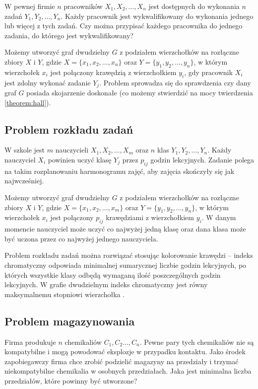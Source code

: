 W pewnej firmie $n$ pracowników $X_1,X_2,\ldots,X_n$ jest dostępnych do wykonania $n$ zadań $Y_1,Y_2,\ldots,Y_n$. Każdy pracownik jest wykwalifikowany do wykonania jednego lub więcej z tych zadań. Czy można przypisać każdego pracownika do jednego zadania, do którego jest wykwalifikowany? 

Możemy utworzyć graf dwudzielny $G$ z podziałem wierzchołków na rozłączne zbiory $X$ i $Y$, gdzie $X=\{x_1,x_2,\ldots,x_n\}$ oraz $Y=\{y_1,y_2,\ldots,y_n\}$, w którym wierzchołek $x_i$ jest połączony krawędzią z wierzchołkiem $y_i$, gdy pracownik $X_i$ jest zdolny wykonać zadanie $Y_j$. Problem sprowadza się do sprawdzenia czy dany graf $G$ posiada skojarzenie doskonałe (co możemy stwierdzić na mocy twierdzenia \ref{theorem:hall}).


\subsection*{Problem rozkładu zadań}

W szkole jest $m$ nauczycieli $X_1,X_2,\ldots,X_m$ oraz $n$ klas $Y_1,Y_2,\ldots,Y_n$. Każdy nauczyciel $X_i$ powinien uczyć klasę $Y_j$ przez $p_{ij}$ godzin lekcyjnych. Zadanie polega na takim rozplanowaniu harmonogramu zajęć, aby zajęcia skończyły się jak najwcześniej. 

Możemy utworzyć graf dwudzielny $G$ z podziałem wierzchołków na rozłączne zbiory $X$ i $Y$, gdzie $X=\{x_1,x_2,\ldots,x_m\}$ oraz $Y=\{y_1,y_2,\ldots,y_n\}$, w którym wierzchołek $x_i$ jest połączony $p_{ij}$ krawędziami z wierzchołkiem $y_i$. W danym momencie nauczyciel może uczyć co najwyżej jedną klasę oraz dana klasa może być uczona przez co najwyżej jednego nauczyciela. 

Problem rozkładu zadań można rozwiązać stosując kolorowanie krawędzi -- indeks chromatyczny odpowiada minimalnej sumarycznej liczbie godzin lekcyjnych, po których wszystkie klasy odbędą wymaganą ilość poszczególnych godzin lekcyjnych. W grafie dwudzielnym indeks chromatyczny jest równy maksymalnemu stopniowi wierzchołka \cite[93]{bondy}.


\subsection*{Problem magazynowania}

Firma produkuje $n$ chemikaliów $C_1,C_2\ldots,C_n$. Pewne pary tych chemikaliów nie są kompatybilne i mogą powodować eksplozje w przypadku kontaktu. Jako środek zapobiegawczy firma chce zrobić podzielić magazyny na przedziały i trzymać niekompatybilne chemikalia w osobnych przedziałach. Jaka jest minimalna liczba przedziałów, które powinny być utworzone?

